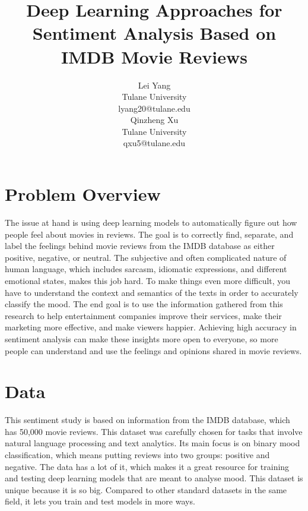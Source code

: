 \documentclass[11pt,a4paper]{article}
\title{Deep Learning Approaches for Sentiment Analysis Based on IMDB Movie Reviews}
\author{Lei Yang \\
  Tulane University \\
  {lyang20@tulane.edu} \\\And
  Qinzheng Xu \\
  Tulane University \\
  {qxu5@tulane.edu} \\}
\date{}
\begin{document}
\maketitle


\section{Problem Overview}

The issue at hand is using deep learning models to automatically figure out how people feel about movies in reviews. The goal is to correctly find, separate, and label the feelings behind movie reviews from the IMDB database as either positive, negative, or neutral. The subjective and often complicated nature of human language, which includes sarcasm, idiomatic expressions, and different emotional states, makes this job hard. To make things even more difficult, you have to understand the context and semantics of the texts in order to accurately classify the mood. The end goal is to use the information gathered from this research to help entertainment companies improve their services, make their marketing more effective, and make viewers happier. Achieving high accuracy in sentiment analysis can make these insights more open to everyone, so more people can understand and use the feelings and opinions shared in movie reviews.



\section{Data}

This sentiment study is based on information from the IMDB database, which has 50,000 movie reviews. This dataset was carefully chosen for tasks that involve natural language processing and text analytics. Its main focus is on binary mood classification, which means putting reviews into two groups: positive and negative. The data has a lot of it, which makes it a great resource for training and testing deep learning models that are meant to analyse mood. This dataset is unique because it is so big. Compared to other standard datasets in the same field, it lets you train and test models in more ways.
\end{document}
